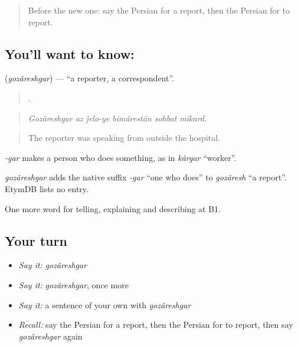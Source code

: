 \label{lesson:FA-C308-gozareshgar}



\begin{quote}
Before the new one: say the Persian for a report, then the Persian for to report.
\end{quote}

\subsection*{You'll want to know: }
\textbf{} (\emph{gozâreshgar}) — \textquotedblleft{}a reporter, a correspondent\textquotedblright{}.

\begin{quote}
     .
\end{quote}

\begin{quote}
\emph{Gozâreshgar az jelo-ye bimârestân sohbat mikard.}
\end{quote}

\begin{quote}
The reporter was speaking from outside the hospital.
\end{quote}

\emph{-gar} makes a person who does something, as in \emph{kârgar} \textquotedblleft{}worker\textquotedblright{}.

\begin{cousinweb}
\emph{gozâreshgar} adds the native suffix \emph{-gar} \textquotedblleft{}one who does\textquotedblright{} to \emph{gozâresh} \textquotedblleft{}a report\textquotedblright{}. EtymDB lists no entry.
\end{cousinweb}

\begin{grammarlens}[title={What you've built}]
One more word for telling, explaining and describing at B1.
\end{grammarlens}

\subsection*{Your turn}
\begin{itemize}
\raggedright
  \item \emph{Say it:} \emph{gozâreshgar}
  \item \emph{Say it:} \emph{gozâreshgar}, once more
  \item \emph{Say it:} a sentence of your own with \emph{gozâreshgar}
  \item \emph{Recall:} say the Persian for a report, then the Persian for to report, then say \emph{gozâreshgar} again
\end{itemize}

